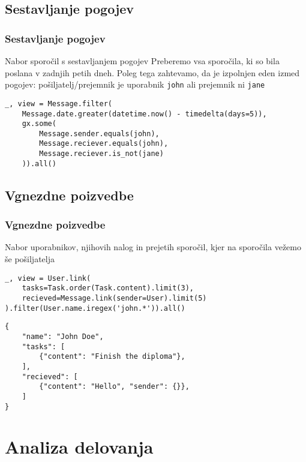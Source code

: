 \documentclass{beamer}
\begin{document}
    \subsection{Sestavljanje pogojev}
    \begin{frame}[fragile]
    \frametitle{Sestavljanje pogojev}
    \begin{block}{Nabor sporočil s sestavljanjem pogojev}
    Preberemo vsa sporočila, ki so bila poslana v zadnjih petih dneh. Poleg tega zahtevamo, da je izpolnjen eden izmed pogojev: pošiljatelj/prejemnik je uporabnik {\tt john} ali prejemnik ni {\tt jane}
    \end{block} 
    \footnotesize
    \begin{verbatim}
_, view = Message.filter(
    Message.date.greater(datetime.now() - timedelta(days=5)), 
    gx.some(
        Message.sender.equals(john),
        Message.reciever.equals(john),
        Message.reciever.is_not(jane)
    )).all()
        \end{verbatim}   
    \end{frame}

    \subsection{Vgnezdne poizvedbe}
    \begin{frame}[fragile]
    \frametitle{Vgnezdne poizvedbe}
    \begin{block}{Nabor uporabnikov, njihovih nalog in prejetih sporočil, kjer na sporočila vežemo še pošiljatelja}
    \footnotesize
    \begin{verbatim}
_, view = User.link(
    tasks=Task.order(Task.content).limit(3), 
    recieved=Message.link(sender=User).limit(5)
).filter(User.name.iregex('john.*')).all()
        \end{verbatim}
    \end{block}

    \footnotesize
    \begin{verbatim}
{
    "name": "John Doe",
    "tasks": [
        {"content": "Finish the diploma"},
    ],
    "recieved": [
        {"content": "Hello", "sender": {}},
    ]
}
    \end{verbatim}
    \end{frame}

    
    
\section{Analiza delovanja}
\end{document}
